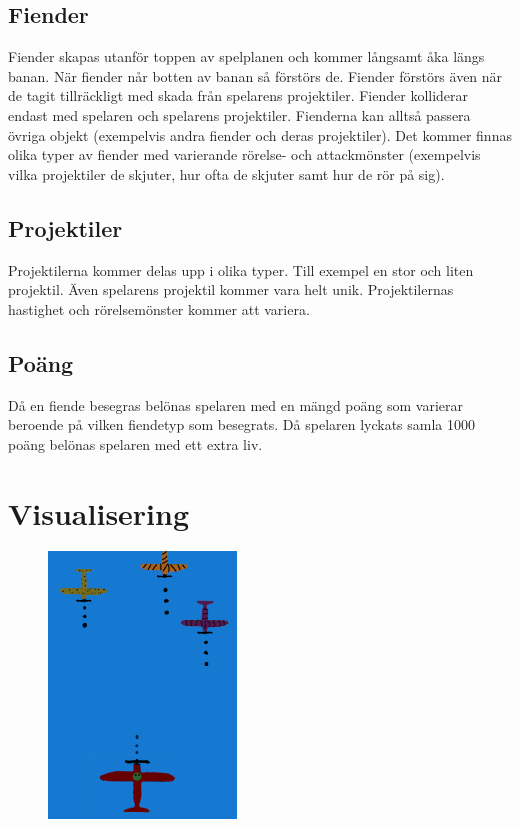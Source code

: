 \documentclass{TDP005mall}
\begin{document}
\subsection{Fiender}
Fiender skapas utanför toppen av spelplanen och kommer långsamt åka längs banan. 
När fiender når botten av banan så förstörs de. Fiender förstörs även när de tagit tillräckligt med skada från spelarens projektiler.
Fiender kolliderar endast med spelaren och spelarens projektiler. Fienderna kan alltså passera övriga objekt (exempelvis andra fiender och deras projektiler).
Det kommer finnas olika typer av fiender med varierande rörelse- och attackmönster (exempelvis vilka projektiler de skjuter, hur ofta de skjuter samt hur de rör på sig).

\subsection{Projektiler}
Projektilerna kommer delas upp i olika typer. Till exempel en stor och liten projektil. Även spelarens projektil kommer vara helt unik.
Projektilernas hastighet och rörelsemönster kommer att variera.

\subsection{Poäng}
Då en fiende besegras belönas spelaren med en mängd poäng som varierar beroende på vilken fiendetyp som besegrats.
Då spelaren lyckats samla 1000 poäng belönas spelaren med ett extra liv.

\section{Visualisering}

\begin{figure}[H]
  \centering
  \includegraphics[width=5cm]{Dogeater.png}
\end{figure}
\end{document}
